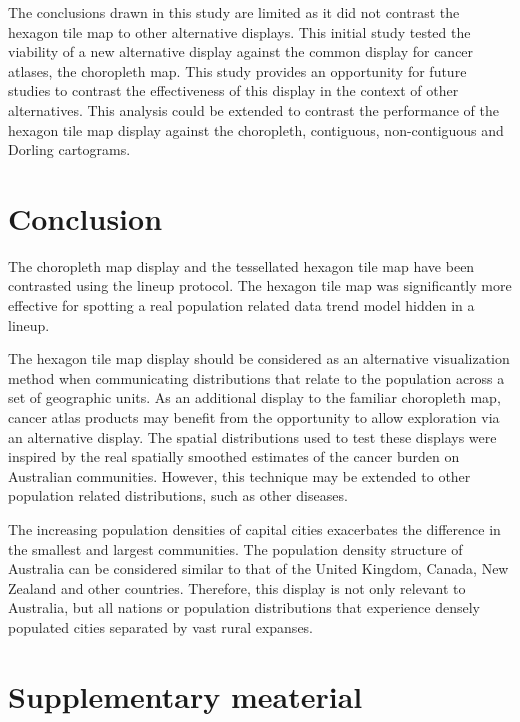 \documentclass{monashthesis}
\begin{document}
The conclusions drawn in this study are limited as it did not contrast the hexagon tile map to other alternative displays.
This initial study tested the viability of a new alternative display against the common display for cancer atlases, the choropleth map.
This study provides an opportunity for future studies to contrast the effectiveness of this display in the context of other alternatives.
This analysis could be extended to contrast the performance of the hexagon tile map display against the choropleth, contiguous, non-contiguous and Dorling cartograms.

\hypertarget{conclusion-04}{%
\section{Conclusion}\label{conclusion-04}}

The choropleth map display and the tessellated hexagon tile map have been contrasted using the lineup protocol. The hexagon tile map was significantly more effective for spotting a real population related data trend model hidden in a lineup.

The hexagon tile map display should be considered as an alternative visualization method when communicating distributions that relate to the population across a set of geographic units. As an additional display to the familiar choropleth map, cancer atlas products may benefit from the opportunity to allow exploration via an alternative display. The spatial distributions used to test these displays were inspired by the real spatially smoothed estimates of the cancer burden on Australian communities. However, this technique may be extended to other population related distributions, such as other diseases.

The increasing population densities of capital cities exacerbates the difference in the smallest and largest communities.
The population density structure of Australia can be considered similar to that of the United Kingdom, Canada, New Zealand and other countries. Therefore, this display is not only relevant to Australia, but all nations or population distributions that experience densely populated cities separated by vast rural expanses.

\hypertarget{supplementary-meaterial}{%
\section{Supplementary meaterial}\label{supplementary-meaterial}}
\end{document}

